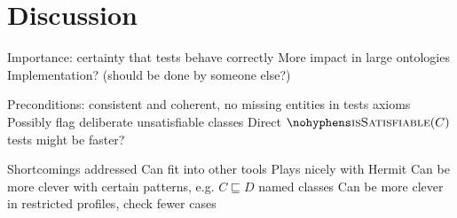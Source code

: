 \documentclass[paper.tex]{subfiles}
\begin{document}
\section{Discussion}
\label{sec:discussion}

\begin{todos}
  \todo Importance: certainty that tests behave correctly
  \todo More impact in large ontologies
  \todo Implementation? (should be done by someone else?)
  \begin{todos}
    \todo Preconditions: consistent and coherent, no missing entities in tests axioms
    \todo Possibly flag deliberate unsatisfiable classes
    \todo Direct $\textproc{isSatisfiable}(C)$ tests
    \todo {} might be faster?
  \end{todos}
  \todo Shortcomings addressed
  \todo Can fit into other tools
  \todo Plays nicely with Hermit
  \todo Can be more clever with certain patterns, e.g. $C \sqsubseteq D$ named classes
  \todo Can be more clever in restricted profiles, check fewer cases
\end{todos}
\end{document}
